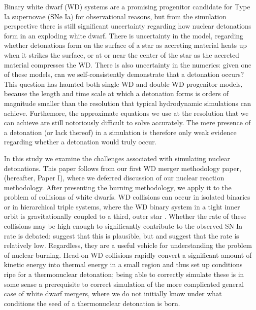\documentclass[twocolumn,numberedappendix]{../aastex6}
\begin{document}
Binary white dwarf (WD) systems are a promising progenitor candidate for Type
Ia supernovae (SNe Ia) for observational reasons, but from the simulation
perspective there is still significant uncertainty regarding how nuclear
detonations form in an exploding white dwarf. There is uncertainty in the
model, regarding whether detonations form on the surface of a star as
accreting material heats up when it strikes the surface, or at or near the
center of the star as the accreted material compresses the WD. There is also
uncertainty in the numerics: given one of these models, can we self-consistently
demonstrate that a detonation occurs? This question has haunted both single
WD and double WD progenitor models, because the length and time scale at which
a detonation forms is orders of magnitude smaller than the resolution that
typical hydrodynamic simulations can achieve. Furthemore, the approximate equations
we use at the resolution that we can achieve are still notoriously
difficult to solve accurately. The mere presence of a detonation
(or lack thereof) in a simulation is therefore only weak evidence regarding
whether a detonation would truly occur.

In this study we examine the challenges associated with simulating nuclear detonations.
This paper follows from our first WD merger methodology paper, \citet{wdmergerI}
(hereafter, Paper I), where we deferred discussion of our nuclear reaction methodology.
After presenting the burning methodology, we apply it to the problem of collisions of white dwarfs.
WD collisions can occur in isolated binaries or in hierarchical triple systems, where the WD binary
system in a tight inner orbit is gravitationally coupled to a third, outer star \citep{thompson:2011,hamers:2013}.
Whether the rate of these collisions may be high enough to significantly contribute to
the observed SN Ia rate is debated: \cite{katzdong:2012} suggest that this is plausible,
but \cite{hamers:2013} and \cite{papish:2015} suggest that the rate is relatively low.
Regardless, they are a useful vehicle for understanding the problem of nuclear burning.
Head-on WD collisions rapidly convert a significant amount of kinetic energy into thermal
energy in a small region and thus set up conditions ripe for a thermonuclear detonation;
being able to correctly simulate these is in some sense a prerequisite to correct simulation
of the more complicated general case of white dwarf mergers, where we do not initially know
under what conditions the seed of a thermonuclear detonation is born.
\end{document}
